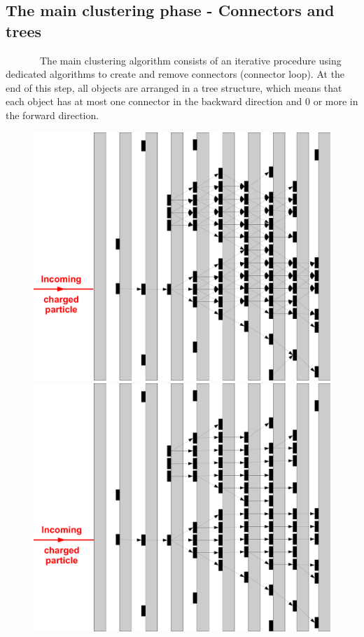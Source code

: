 \documentclass[12pt]{article}
\begin{document}
\subsection{The main clustering phase - Connectors and trees}

~~~~~~~The main clustering algorithm consists of an iterative procedure using dedicated algorithms to create and remove connectors (connector loop). At the end of this step, all objects are arranged in a tree structure, which means that each object has at most one connector in the backward direction and 0 or more in the forward direction.

\begin{figure}[!h]
  \begin{minipage}{0.49\linewidth}
    \begin{center}
      \includegraphics[width=0.9\linewidth]{ConnectorSeeding1.pdf}
    \end{center}
  \end{minipage}
  \begin{minipage}{0.49\linewidth}
    \begin{center}
      \includegraphics[width=0.9\linewidth]{ConnectorCleaning1.pdf}

\end{center}
\end{minipage}
\end{figure}
\end{document}
